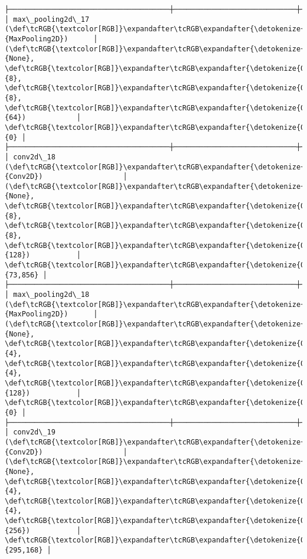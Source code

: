 \documentclass[11pt]{article}
\begin{document}
\begin{Verbatim}[commandchars=\\\{\}]
├──────────────────────────────────────┼─────────────────────────────┼─────────────────┤
│ max\_pooling2d\_17 (\def\tcRGB{\textcolor[RGB]}\expandafter\tcRGB\expandafter{\detokenize{0,135,255}}{MaxPooling2D})      │ (\def\tcRGB{\textcolor[RGB]}\expandafter\tcRGB\expandafter{\detokenize{0,215,255}}{None}, \def\tcRGB{\textcolor[RGB]}\expandafter\tcRGB\expandafter{\detokenize{0,175,0}}{8}, \def\tcRGB{\textcolor[RGB]}\expandafter\tcRGB\expandafter{\detokenize{0,175,0}}{8}, \def\tcRGB{\textcolor[RGB]}\expandafter\tcRGB\expandafter{\detokenize{0,175,0}}{64})            │               \def\tcRGB{\textcolor[RGB]}\expandafter\tcRGB\expandafter{\detokenize{0,175,0}}{0} │
├──────────────────────────────────────┼─────────────────────────────┼─────────────────┤
│ conv2d\_18 (\def\tcRGB{\textcolor[RGB]}\expandafter\tcRGB\expandafter{\detokenize{0,135,255}}{Conv2D})                   │ (\def\tcRGB{\textcolor[RGB]}\expandafter\tcRGB\expandafter{\detokenize{0,215,255}}{None}, \def\tcRGB{\textcolor[RGB]}\expandafter\tcRGB\expandafter{\detokenize{0,175,0}}{8}, \def\tcRGB{\textcolor[RGB]}\expandafter\tcRGB\expandafter{\detokenize{0,175,0}}{8}, \def\tcRGB{\textcolor[RGB]}\expandafter\tcRGB\expandafter{\detokenize{0,175,0}}{128})           │          \def\tcRGB{\textcolor[RGB]}\expandafter\tcRGB\expandafter{\detokenize{0,175,0}}{73,856} │
├──────────────────────────────────────┼─────────────────────────────┼─────────────────┤
│ max\_pooling2d\_18 (\def\tcRGB{\textcolor[RGB]}\expandafter\tcRGB\expandafter{\detokenize{0,135,255}}{MaxPooling2D})      │ (\def\tcRGB{\textcolor[RGB]}\expandafter\tcRGB\expandafter{\detokenize{0,215,255}}{None}, \def\tcRGB{\textcolor[RGB]}\expandafter\tcRGB\expandafter{\detokenize{0,175,0}}{4}, \def\tcRGB{\textcolor[RGB]}\expandafter\tcRGB\expandafter{\detokenize{0,175,0}}{4}, \def\tcRGB{\textcolor[RGB]}\expandafter\tcRGB\expandafter{\detokenize{0,175,0}}{128})           │               \def\tcRGB{\textcolor[RGB]}\expandafter\tcRGB\expandafter{\detokenize{0,175,0}}{0} │
├──────────────────────────────────────┼─────────────────────────────┼─────────────────┤
│ conv2d\_19 (\def\tcRGB{\textcolor[RGB]}\expandafter\tcRGB\expandafter{\detokenize{0,135,255}}{Conv2D})                   │ (\def\tcRGB{\textcolor[RGB]}\expandafter\tcRGB\expandafter{\detokenize{0,215,255}}{None}, \def\tcRGB{\textcolor[RGB]}\expandafter\tcRGB\expandafter{\detokenize{0,175,0}}{4}, \def\tcRGB{\textcolor[RGB]}\expandafter\tcRGB\expandafter{\detokenize{0,175,0}}{4}, \def\tcRGB{\textcolor[RGB]}\expandafter\tcRGB\expandafter{\detokenize{0,175,0}}{256})           │         \def\tcRGB{\textcolor[RGB]}\expandafter\tcRGB\expandafter{\detokenize{0,175,0}}{295,168} │

\end{Verbatim}
\end{document}
